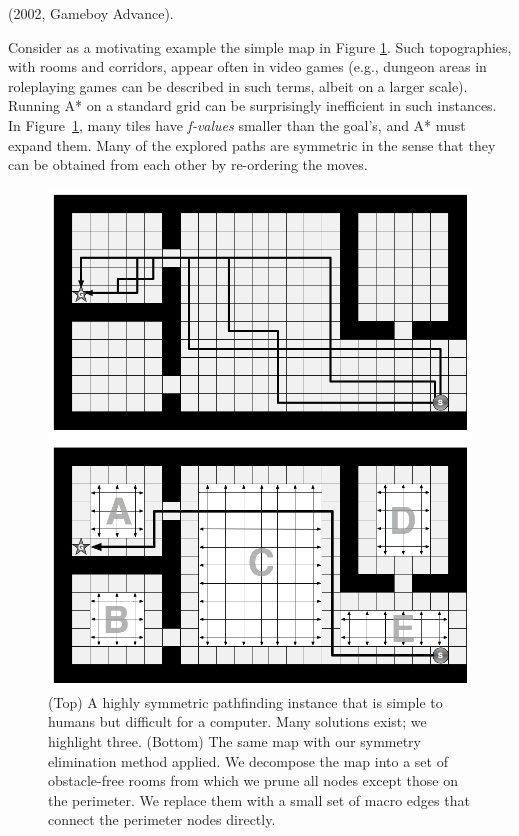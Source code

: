 (2002, Gameboy Advance). 
\par
Consider as a motivating example the simple map in Figure \ref{fig-overview}.
Such topographies, with rooms and corridors, appear often in video games 
(e.g., dungeon areas in roleplaying games
can be described in such terms, albeit on a larger scale).
Running A* on a standard grid can be surprisingly inefficient in such instances.
In Figure~\ref{fig-overview}, many tiles have \emph{f-values} smaller than the goal's,
and A* must expand them.
Many of the explored paths are symmetric in the sense that they can be obtained from each other
by re-ordering the moves.

\begin{figure}[tb]
       \begin{center}
                       \includegraphics[scale=0.30, trim = 10mm 10mm 10mm 0mm]{diagrams/overview.png}
       \end{center}
	\vspace{-3pt}
       \caption{(Top) A highly symmetric pathfinding instance that is simple to humans but difficult 
				for a computer.
				Many solutions exist; we highlight three. 
				(Bottom) The same map with our symmetry elimination method applied. We decompose the map
				into a set of obstacle-free rooms from which we prune all nodes except those on the perimeter.
				We replace them with a small set of macro edges that connect the perimeter nodes directly.} 
       \label{fig-overview}
\end{figure}

